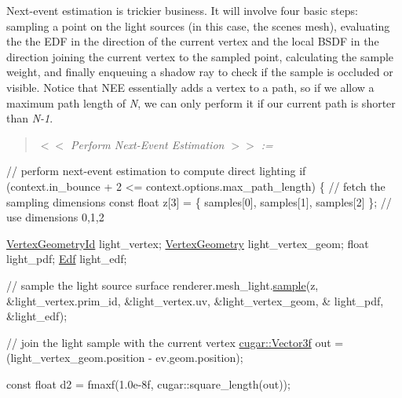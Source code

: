 \begin{DoxyParagraph}{}
Next-\/event estimation is trickier business. It will involve four basic steps\+: sampling a point on the light sources (in this case, the scene\textquotesingle{}s mesh), evaluating the the E\+DF in the direction of the current vertex and the local B\+S\+DF in the direction joining the current vertex to the sampled point, calculating the sample weight, and finally enqueuing a shadow ray to check if the sample is occluded or visible. Notice that N\+EE essentially adds a vertex to a path, so if we allow a maximum path length of {\itshape N}, we can only perform it if our current path is shorter than {\itshape N-\/1}. ~\newline
\label{_hello_renderer_page_Perform_Next-Event_Estimation_anchor}%
%
 \begin{quote}
{\itshape  $<$$<$ Perform Next-\/\+Event Estimation $>$$>$ \+:= }

\end{quote}

\begin{DoxyCode}
 \textcolor{comment}{// perform next-event estimation to compute direct lighting}
 \textcolor{keywordflow}{if} (context.in\_bounce + 2 <= context.options.max\_path\_length)
 \{
     \textcolor{comment}{// fetch the sampling dimensions}
     \textcolor{keyword}{const} \textcolor{keywordtype}{float} z[3] = \{ samples[0], samples[1], samples[2] \}; \textcolor{comment}{// use dimensions 0,1,2}
 
     \hyperlink{struct_vertex_geometry_id}{VertexGeometryId} light\_vertex;
     \hyperlink{struct_vertex_geometry}{VertexGeometry}   light\_vertex\_geom;
     \textcolor{keywordtype}{float}            light\_pdf;
     \hyperlink{struct_edf}{Edf}              light\_edf;
 
     \textcolor{comment}{// sample the light source surface}
     renderer.mesh\_light.\hyperlink{group___lights_module_ga67cc240bcda4b08efd26c8727144bf16}{sample}(z, &light\_vertex.prim\_id, &light\_vertex.uv, &light\_vertex\_geom, &
      light\_pdf, &light\_edf);
    
    \textcolor{comment}{// join the light sample with the current vertex}
    \hyperlink{structcugar_1_1_vector}{cugar::Vector3f} out = (light\_vertex\_geom.position - ev.geom.position);
                          
    \textcolor{keyword}{const} \textcolor{keywordtype}{float} d2 = fmaxf(1.0e-8f, cugar::square\_length(out));
    

\end{DoxyCode}
\end{DoxyParagraph}
